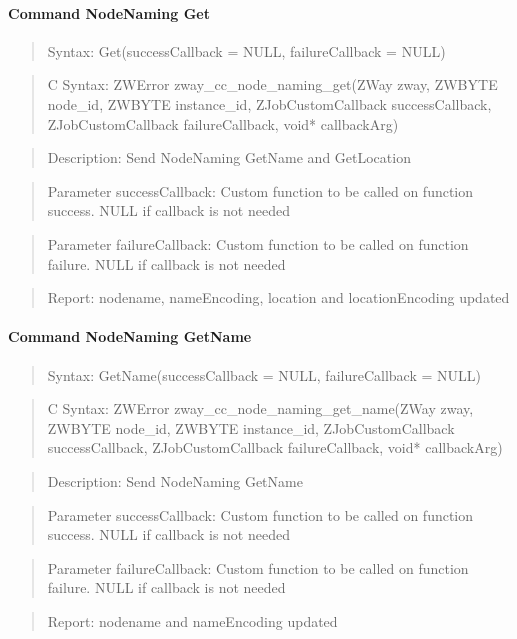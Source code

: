 \paragraph{Command NodeNaming Get}
\begin{quote}Syntax: Get(successCallback = NULL, failureCallback = NULL)\end{quote}
\begin{quote}C Syntax: ZWError zway\_cc\_node\_naming\_get(ZWay zway, ZWBYTE node\_id, ZWBYTE instance\_id, ZJobCustomCallback successCallback, ZJobCustomCallback failureCallback, void* callbackArg)\end{quote}
\begin{quote}Description: Send NodeNaming GetName and GetLocation\end{quote}
\begin{quote}Parameter successCallback: Custom function to be called on function success. NULL if callback is not needed\end{quote}
\begin{quote}Parameter failureCallback: Custom function to be called on function failure. NULL if callback is not needed\end{quote}
\begin{quote}Report: nodename, nameEncoding, location and locationEncoding updated\end{quote}

\paragraph{Command NodeNaming GetName}
\begin{quote}Syntax: GetName(successCallback = NULL, failureCallback = NULL)\end{quote}
\begin{quote}C Syntax: ZWError zway\_cc\_node\_naming\_get\_name(ZWay zway, ZWBYTE node\_id, ZWBYTE instance\_id, ZJobCustomCallback successCallback, ZJobCustomCallback failureCallback, void* callbackArg)\end{quote}
\begin{quote}Description: Send NodeNaming GetName\end{quote}
\begin{quote}Parameter successCallback: Custom function to be called on function success. NULL if callback is not needed\end{quote}
\begin{quote}Parameter failureCallback: Custom function to be called on function failure. NULL if callback is not needed\end{quote}
\begin{quote}Report: nodename and nameEncoding updated\end{quote}

